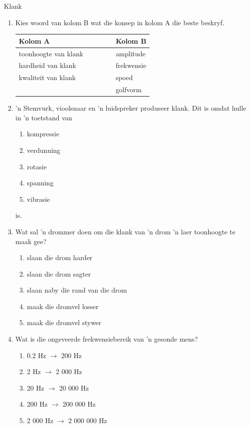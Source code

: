\begin{eocexercises}{Klank}
            \nopagebreak
\begin{enumerate}[noitemsep, label=\textbf{\arabic*}. ] 
\item Kies \n woord van kolom B wat die konsep in kolom A die beste beskryf. 
          \begin{center}
\begin{tabular}{ll}
\textbf{Kolom A} & \textbf{Kolom B} \\ \hline
toonhoogte van klank \ \ \ & amplitude \\
hardheid van klank \ \ \ \ \ \ \ \ \ & frekwensie \\
kwaliteit van klank \ \ \ & spoed \\
& golfvorm \\
\end{tabular}
\end{center}
    \par
\item  'n Stemvurk, vioolsnaar en  'n luidspreker produseer klank. Dit is omdat hulle in  'n toetstand van
\begin{enumerate}[noitemsep, label=\textbf{\alph*}. ] 
    \item kompressie
    \item verdunning
    \item rotasie
    \item spanning
    \item vibrasie
\end{enumerate}
is.

\item Wat sal  'n drommer doen om die klank van  'n drom  'n laer toonhoogte te maak gee?
\begin{enumerate}[noitemsep, label=\textbf{\alph*}. ] 
    \item slaan die drom harder
    \item slaan die drom sagter
    \item slaan naby die rand van die drom
    \item maak die dromvel losser
    \item maak die dromvel stywer
\end{enumerate}

\item Wat is die ongeveerde frekwensiebereik van  'n gesonde mens?
\begin{enumerate}[noitemsep, label=\textbf{\alph*}. ] 
\item 0.2 Hz $\to $ 200 Hz
\item 2 Hz $\to $ 2 000 Hz
\item 20 Hz $\to $ 20 000 Hz
\item 200 Hz $\to $ 200 000 Hz
\item 2 000 Hz $\to $ 2 000 000 Hz
\end{enumerate}
                

\end{enumerate}
\end{eocexercises}
